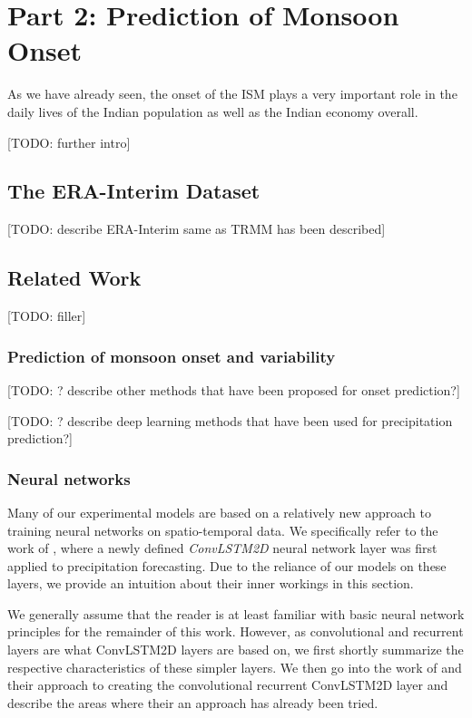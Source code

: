 \chapter{Part 2: Prediction of Monsoon Onset}
\label{c:part2}
As we have already seen, the onset of the ISM plays a very important role in the daily lives of the Indian population as well as the Indian economy overall.

[TODO: further intro]

\section{The ERA-Interim Dataset}
\label{st:era_interim}
[TODO: describe ERA-Interim same as TRMM has been described]

\section{Related Work}
[TODO: filler]

\subsection{Prediction of monsoon onset and variability}
\label{sst:related_prediction}
[TODO: ? describe other methods that have been proposed for onset prediction?]

[TODO: ? describe deep learning methods that have been used for precipitation prediction?]


\subsection{Neural networks}
\label{sst:neural_networks}
Many of our experimental models are based on a relatively new approach to training neural networks on spatio-temporal data. We specifically refer to the work of \citet{Shi.2015}, where a newly defined \textit{ConvLSTM2D} neural network layer was first applied to precipitation forecasting. Due to the reliance of our models on these layers, we provide an intuition about their inner workings in this section.

We generally assume that the reader is at least familiar with basic neural network principles for the remainder of this work. However, as convolutional and recurrent layers are what ConvLSTM2D layers are based on, we first shortly summarize the respective characteristics of these simpler layers. We then go into the work of \citet{Shi.2015} and their approach to creating the convolutional recurrent ConvLSTM2D layer and describe the areas where their an approach has already been tried.

